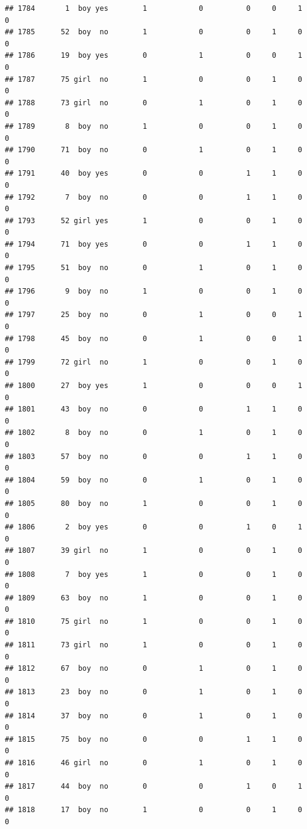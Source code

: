 \documentclass[man]{apa6}
\begin{document}
\begin{verbatim}
## 1784       1  boy yes        1            0          0     0     1     0
## 1785      52  boy  no        1            0          0     1     0     0
## 1786      19  boy yes        0            1          0     0     1     0
## 1787      75 girl  no        1            0          0     1     0     0
## 1788      73 girl  no        0            1          0     1     0     0
## 1789       8  boy  no        1            0          0     1     0     0
## 1790      71  boy  no        0            1          0     1     0     0
## 1791      40  boy yes        0            0          1     1     0     0
## 1792       7  boy  no        0            0          1     1     0     0
## 1793      52 girl yes        1            0          0     1     0     0
## 1794      71  boy yes        0            0          1     1     0     0
## 1795      51  boy  no        0            1          0     1     0     0
## 1796       9  boy  no        1            0          0     1     0     0
## 1797      25  boy  no        0            1          0     0     1     0
## 1798      45  boy  no        0            1          0     0     1     0
## 1799      72 girl  no        1            0          0     1     0     0
## 1800      27  boy yes        1            0          0     0     1     0
## 1801      43  boy  no        0            0          1     1     0     0
## 1802       8  boy  no        0            1          0     1     0     0
## 1803      57  boy  no        0            0          1     1     0     0
## 1804      59  boy  no        0            1          0     1     0     0
## 1805      80  boy  no        1            0          0     1     0     0
## 1806       2  boy yes        0            0          1     0     1     0
## 1807      39 girl  no        1            0          0     1     0     0
## 1808       7  boy yes        1            0          0     1     0     0
## 1809      63  boy  no        1            0          0     1     0     0
## 1810      75 girl  no        1            0          0     1     0     0
## 1811      73 girl  no        1            0          0     1     0     0
## 1812      67  boy  no        0            1          0     1     0     0
## 1813      23  boy  no        0            1          0     1     0     0
## 1814      37  boy  no        0            1          0     1     0     0
## 1815      75  boy  no        0            0          1     1     0     0
## 1816      46 girl  no        0            1          0     1     0     0
## 1817      44  boy  no        0            0          1     0     1     0
## 1818      17  boy  no        1            0          0     1     0     0

\end{verbatim}
\end{document}

